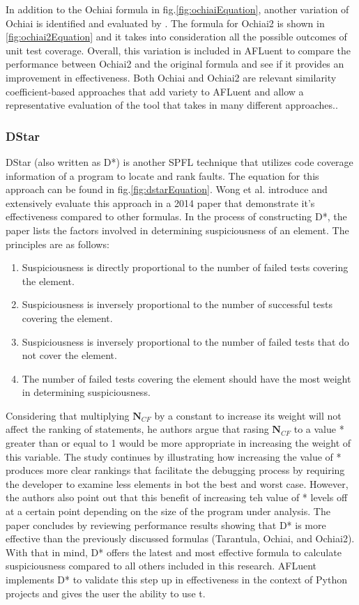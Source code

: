 In addition to the Ochiai formula in fig.\ref{fig:ochiaiEquation}, another
variation of Ochiai is identified and evaluated by \cite{naish2011model}. The
formula for Ochiai2 is shown in \ref{fig:ochiai2Equation} and it takes into
consideration all the possible outcomes of unit test coverage. Overall, this
variation is included in AFLuent to compare the performance between Ochiai2 and
the original formula and see if it provides an improvement in effectiveness.
Both Ochiai and Ochiai2 are relevant similarity coefficient-based approaches
that add variety to AFLuent and allow a representative evaluation of the tool
that takes in many different approaches..

\subsubsection{DStar}
\label{subsubsec:dstar_lit}

DStar (also written as D*) is another SPFL technique that utilizes code coverage
information of a program to locate and rank faults. The equation for this
approach can be found in fig.\ref{fig:dstarEquation}. Wong et al.
\cite{Wong2014DStar} introduce and extensively evaluate this approach in a 2014
paper that demonstrate it's effectiveness compared to other formulas. In the
process of constructing D*, the paper lists the factors involved in determining
suspiciousness of an element. The principles are as follows:
\begin{enumerate}
	\item Suspiciousness is directly proportional to the number of failed tests
	covering the element.
	\item Suspiciousness is inversely proportional to the number of successful tests
	covering the element.
	\item Suspiciousness is inversely proportional to the number of failed tests
	that do not cover the element.
	\item The number of failed tests covering the element should have the most
	weight in determining suspiciousness.
\end{enumerate}

Considering that multiplying \(\textbf{N$_{CF}$}\) by a constant to increase its
weight will not affect the ranking of statements, he authors argue that
rasing \(\textbf{N$_{CF}$}\) to a value * greater than
or equal to 1 would be more appropriate in increasing the weight of this
variable. The study continues by illustrating how increasing the value of *
produces more clear rankings that facilitate the debugging process by requiring
the developer to examine less elements in bot the best and worst case. However,
the authors also point out that this benefit of increasing teh value of * levels
off at a certain point depending on the size of the program under analysis.
The paper concludes by reviewing performance results showing that D* is more
effective than the previously discussed formulas (Tarantula, Ochiai, and
Ochiai2). With that in mind, D* offers the latest and most effective formula to
calculate suspiciousness compared to all others included in this research.
AFLuent implements D* to validate this step up in effectiveness in the context of
Python projects and gives the user the ability to use t.

